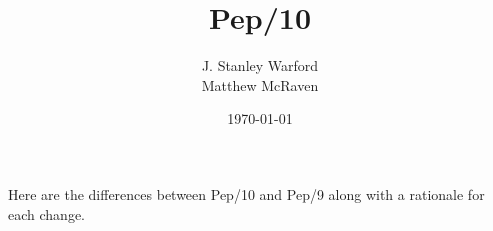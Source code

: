 \documentclass[10pt,fleqn]{book}
\begin{document}
\frontmatter

	\title{\Huge Pep/10}
	\author{J. Stanley Warford\\Matthew McRaven}
	\date{\today}
	\maketitle


\mainmatter
	\pagestyle{fancy}
	\fancyhf{}
	\renewcommand{\headrulewidth}{1pt}
	\renewcommand{\footrulewidth}{0pt}
	\renewcommand{\chaptermark}[1]{\markboth{\sffamily\chaptername{} \thechapter\quad \large\rmfamily\slshape#1}{}}
	\renewcommand{\sectionmark}[1]{\markright{#1}}
	\renewcommand{\headrule}{{\color{blue} \hrule width\headwidth height\headrulewidth \vskip-\headrulewidth}}	

\setcounter{page}{1}
\noindent Here are the differences between Pep/10 and Pep/9 along with a rationale for each change.
\end{document}
